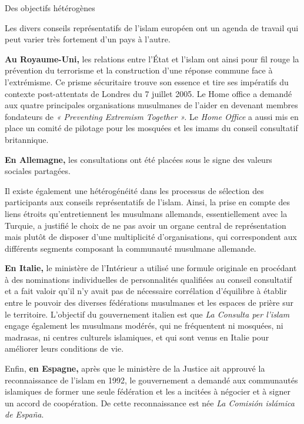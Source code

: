 Des objectifs hétérogènes


Les divers conseils représentatifs de l'islam européen ont un agenda de
travail qui peut varier très fortement d'un pays à l'autre.



\textbf{Au Royaume-Uni,} les relations entre l'État et l'islam ont ainsi
pour fil rouge la prévention du terrorisme et la construction d'une
réponse commune face à l'extrémisme. Ce prisme sécuritaire trouve son
essence et tire ses impératifs du contexte post-attentats de Londres du
7 juillet 2005. Le Home office a demandé aux quatre principales
organisations musulmanes de l'aider en devenant membres fondateurs de
\emph{« Preventing Extremism Together ».} Le \emph{Home Office} a aussi
mis en place un comité de pilotage pour les mosquées et les imams du
conseil consultatif britannique.

\textbf{En Allemagne,} les consultations ont été placées sous le signe
des valeurs sociales partagées.

Il existe également une hétérogénéité dans les processus de sélection
des participants aux conseils représentatifs de l'islam. Ainsi, la prise
en compte des liens étroits qu'entretiennent les musulmans allemands,
essentiellement avec la Turquie, a justifié le choix de ne pas avoir un
organe central de représentation mais plutôt de disposer d'une
multiplicité d'organisations, qui correspondent aux différents segments
composant la communauté musulmane allemande.

\textbf{En Italie,} le ministère de l'Intérieur a utilisé une formule
originale en procédant à des nominations individuelles de personnalités
qualifiées au conseil consultatif et a fait valoir qu'il n'y avait pas
de nécessaire corrélation d'équilibre à établir entre le pouvoir des
diverses fédérations musulmanes et les espaces de prière sur le
territoire. L'objectif du gouvernement italien est que \emph{La Consulta
per l'islam} engage également les musulmans modérés, qui ne fréquentent
ni mosquées, ni madrasas, ni centres culturels islamiques, et qui sont
venus en Italie pour améliorer leurs conditions de vie.

Enfin, \textbf{en Espagne,} après que le ministère de la Justice ait
approuvé la reconnaissance de l'islam en 1992, le gouvernement a demandé
aux communautés islamiques de former une seule fédération et les a
incitées à négocier et à signer un accord de coopération. De cette
reconnaissance est née \emph{La Comisión islámica de España}.

